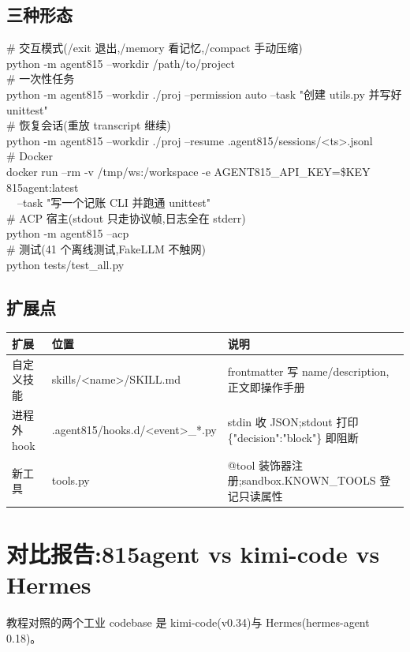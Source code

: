 \documentclass[10pt,a4paper]{article}
\renewcommand{\small}{\fontsize{8}{11.5}\selectfont}
\renewcommand{\footnotesize}{\fontsize{7.5}{10.5}\selectfont}
\begin{document}
\subsection{三种形态}
{\footnotesize\ttfamily
\# 交互模式(/exit 退出,/memory 看记忆,/compact 手动压缩)\\
python -m agent815 --workdir /path/to/project\\[3pt]
\# 一次性任务\\
python -m agent815 --workdir ./proj --permission auto --task "创建 utils.py 并写好 unittest"\\[3pt]
\# 恢复会话(重放 transcript 继续)\\
python -m agent815 --workdir ./proj --resume .agent815/sessions/<ts>.jsonl\\[3pt]
\# Docker\\
docker run --rm -v /tmp/ws:/workspace -e AGENT815\_API\_KEY=\$KEY 815agent:latest\\
\ \ --task "写一个记账 CLI 并跑通 unittest"\\[3pt]
\# ACP 宿主(stdout 只走协议帧,日志全在 stderr)\\
python -m agent815 --acp\\[3pt]
\# 测试(41 个离线测试,FakeLLM 不触网)\\
python tests/test\_all.py
}

\subsection{扩展点}
{\small
\begin{longtable}{L{0.14\textwidth}L{0.30\textwidth}L{0.48\textwidth}}
\hline
{}\textbf{扩展} & \textbf{位置} & \textbf{说明}\\\hline\endhead
自定义技能 & skills/<name>/SKILL.md & frontmatter 写 name/description,正文即操作手册\\\hline
进程外 hook & .agent815/hooks.d/<event>\_*.py & stdin 收 JSON;stdout 打印 \{"decision":"block"\} 即阻断\\\hline
新工具 & tools.py & @tool 装饰器注册;sandbox.KNOWN\_TOOLS 登记只读属性\\\hline
\end{longtable}}

\section{对比报告:815agent vs kimi-code vs Hermes}

教程对照的两个工业 codebase 是 kimi-code(v0.34)与 Hermes(hermes-agent 0.18)。
\end{document}
